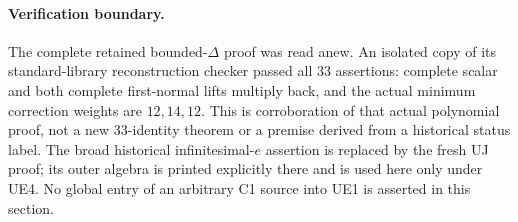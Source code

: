 \paragraph{Verification boundary.}
The complete retained bounded-\(\Delta\) proof was read anew.
An isolated copy of its standard-library reconstruction checker
passed all \(33\) assertions: complete scalar and both complete
first-normal lifts multiply back, and the actual minimum correction
weights are \(12,14,12\).  This is corroboration of that actual
polynomial proof, not a new \(33\)-identity theorem or a premise
derived from a historical status label.  The broad historical
infinitesimal-\(e\) assertion is replaced by the fresh UJ proof;
its outer algebra is printed explicitly there and is used here
only under UE4.  No global entry of an arbitrary C1 source into
UE1 is asserted in this section.
